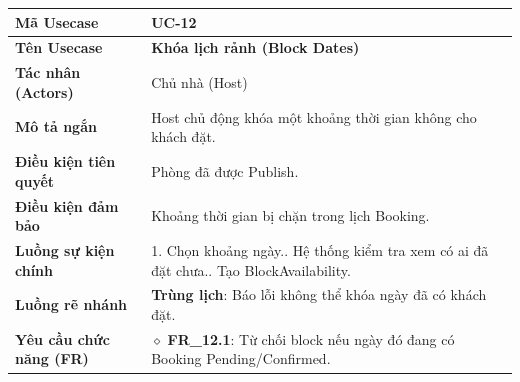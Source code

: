 \begin{table}[H]
\renewcommand{\arraystretch}{1.3}
\centering
\begin{tabularx}{\textwidth}{|p{4.5cm}|X|}
\hline
\cellcolor{gray!15}\bfseries Mã Usecase & \textbf{UC-12} \\ \hline
\cellcolor{gray!15}\bfseries Tên Usecase & \textbf{Khóa lịch rảnh (Block Dates)} \\ \hline
\cellcolor{gray!15}\bfseries Tác nhân (Actors) & Chủ nhà (Host) \\ \hline
\cellcolor{gray!15}\bfseries Mô tả ngắn & Host chủ động khóa một khoảng thời gian không cho khách đặt. \\ \hline
\cellcolor{gray!15}\bfseries Điều kiện tiên quyết & Phòng đã được Publish. \\ \hline
\cellcolor{gray!15}\bfseries Điều kiện đảm bảo & Khoảng thời gian bị chặn trong lịch Booking. \\ \hline
\cellcolor{gray!15}\bfseries Luồng sự kiện chính & 1. Chọn khoảng ngày.\newline 2. Hệ thống kiểm tra xem có ai đã đặt chưa.\newline 3. Tạo BlockAvailability. \\ \hline
\cellcolor{gray!15}\bfseries Luồng rẽ nhánh & \textbf{Trùng lịch}: Báo lỗi không thể khóa ngày đã có khách đặt. \\ \hline
\cellcolor{gray!15}\bfseries Yêu cầu chức năng (FR) & $\diamond$ \textbf{FR\_12.1}: Từ chối block nếu ngày đó đang có Booking Pending/Confirmed. \\ \hline
\end{tabularx}
\end{table}

